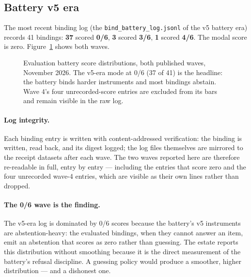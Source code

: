 \subsection{Battery v5 era}
The most recent binding log (the \texttt{bind\_battery\_log.jsonl} of the v5 battery era) records 41 bindings: \textbf{37} scored \textbf{0/6}, \textbf{3} scored \textbf{3/6}, \textbf{1} scored \textbf{4/6}. The modal score is zero. Figure~\ref{fig:battery} shows both waves.

\begin{figure}[htbp]
\centering
{}
\caption{Evaluation battery score distributions, both published waves, November 2026. The v5-era mode at 0/6 (37 of 41) is the headline: the battery binds harder instruments and most bindings abstain. Wave 4's four unrecorded-score entries are excluded from its bars and remain visible in the raw log.}
\label{fig:battery}
\end{figure}

\paragraph{Log integrity.} Each binding entry is written with content-addressed verification: the binding is written, read back, and its digest logged; the log files themselves are mirrored to the receipt datasets after each wave. The two waves reported here are therefore re-readable in full, entry by entry --- including the entries that score zero and the four unrecorded wave-4 entries, which are visible as their own lines rather than dropped.

\paragraph{The 0/6 wave is the finding.} The v5-era log is dominated by 0/6 scores because the battery's v5 instruments are abstention-heavy: the evaluated bindings, when they cannot answer an item, emit an abstention that scores as zero rather than guessing. The estate reports this distribution without smoothing because it is the direct measurement of the battery's refusal discipline. A guessing policy would produce a smoother, higher distribution --- and a dishonest one.
